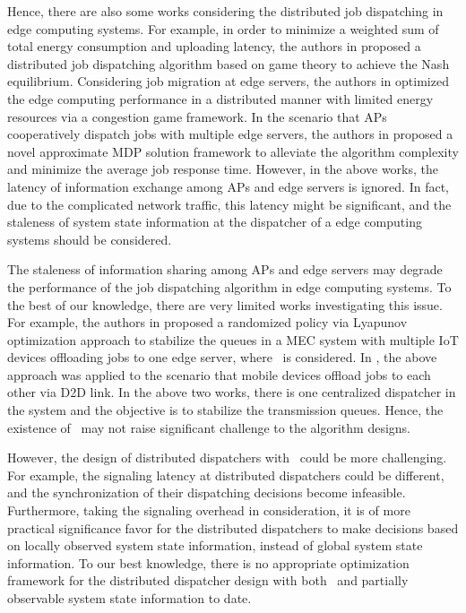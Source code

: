 Hence, there are also some works considering the distributed job dispatching in edge computing systems.
For example, in order to minimize a weighted sum of total energy consumption and uploading latency, the authors in \cite{ToN-Xuchen2016} proposed a distributed job dispatching algorithm based on game theory to achieve the Nash equilibrium. 
Considering job migration at edge servers, the authors in \cite{ToN-xujie2018} optimized the edge computing performance in a distributed manner with limited energy resources via a congestion game framework.
In the scenario that APs cooperatively dispatch jobs with multiple edge servers, the authors in \cite{mdp-jcin} proposed a novel approximate MDP solution framework to alleviate the algorithm complexity and minimize the average job response time.
However, in the above works, the latency of information exchange among APs and edge servers is ignored.
In fact, due to the complicated network traffic, this latency might be significant, and the staleness of system state information at the dispatcher of a edge computing systems should be considered.

The staleness of information sharing among APs and edge servers may degrade the performance of the job dispatching algorithm in edge computing systems.
To the best of our knowledge, there are very limited works investigating this issue.
For example, the authors in \cite{JSAC17-LyuX} proposed a randomized policy via Lyapunov optimization approach to stabilize the queues in a MEC system with multiple IoT devices offloading jobs to one edge server, where \brlatency~is considered. 
In \cite{TWC18-LyuX}, the above approach was applied to the scenario that mobile devices offload jobs to each other via D2D link.
In the above two works, there is one centralized dispatcher in the system and the objective is to stabilize the transmission queues.
Hence, the existence of \brlatency~may not raise significant challenge to the algorithm designs.

However, the design of distributed dispatchers with \brlatency~could be more challenging.
For example, the signaling latency at distributed dispatchers could be different, and the synchronization of their dispatching decisions become infeasible.
Furthermore, taking the signaling overhead in consideration, it is of more practical significance favor for the distributed dispatchers to make decisions based on locally observed system state information, instead of global system state information.
To our best knowledge, there is no appropriate optimization framework for the distributed dispatcher design with both \brlatency~and partially observable system state information to date.

